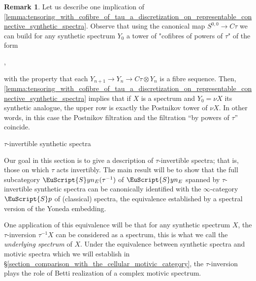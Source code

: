 \documentclass[oneside,a4paper]{amsart}
\makeatletter
\newcommand{\euscr}[1]{\EuScript{#1}} %
\newcommand{\spectra}{\euscr{S}p} %
\newcommand{\synspectra}{\euscr{S}yn} %
\theoremstyle{plain}
\theoremstyle{definition}
\newtheorem{rem}[thm]{Remark}
\theoremstyle{remark}
\def\subsection{\@startsection{subsection}{1}%
  \z@{.7\linespacing\@plus\linespacing}{.5\linespacing}%
  {\normalfont\bfseries\centering}}%
\makeatother
\begin{document}
\begin{rem}
\label{rem:postnikov_filtration_of_synthetic_analogues_coincides_with_filtration_by_powers_of_ctau}
Let us describe one implication of \cref{lemma:tensoring_with_cofibre_of_tau_a_discretization_on_representable_connective_synthetic_spectra}. Observe that using the canonical map $S^{0, 0} \rightarrow C\tau$ we can build for any synthetic spectrum $Y_{0}$ a tower of "cofibres of powers of $\tau$" of the form 

\begin{center}
	,
\end{center}
with the property that each $Y_{n+1} \rightarrow Y_{n} \rightarrow C\tau \otimes Y_{n}$ is a fibre sequence. Then, \cref{lemma:tensoring_with_cofibre_of_tau_a_discretization_on_representable_connective_synthetic_spectra} implies that if $X$ is a spectrum and $Y_{0} = \nu X$ its synthetic analogue, the upper row is exactly the Postnikov tower of $\nu X$. In other words, in this case the Postnikov filtration and the filtration ``by powers of $\tau$'' coincide. 
\end{rem}

\subsection{$\tau$-invertible synthetic spectra}
\label{subsection:tau_invertible_synthetic_spectra}

Our goal in this section is to give a description of $\tau$-invertible spectra; that is, those on which $\tau$ acts invertibly.  The main result will be to show that the full subcategory $\synspectra_{E}(\tau^{-1})$ of $\synspectra_{E}$ spanned by $\tau$-invertible synthetic spectra can be canonically identified with the $\infty$-category $\spectra$ of (classical) spectra, the equivalence established by a spectral version of the Yoneda embedding. 

One application of this equivalence will be that for any synthetic spectrum $X$, the $\tau$-inversion $\tau^{-1} X$ can be considered as a spectrum, this is what we call the \emph{underlying spectrum} of $X$. Under the equivalence between synthetic spectra and motivic spectra which we will establish in \S\ref{section_comparison_with_the_cellular_motivic_category}, the $\tau$-inversion plays the role of Betti realization of a complex motivic spectrum.
\end{document}
